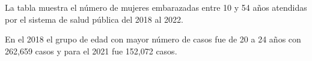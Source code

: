 La tabla muestra el número de mujeres embarazadas entre 10 y 54 años atendidas por el sistema de salud pública del 2018 al 2022. 

En el 2018 el grupo de edad con mayor número de casos fue de 20 a 24 años con 262,659 casos y para el 2021 fue 152,072 casos. 


